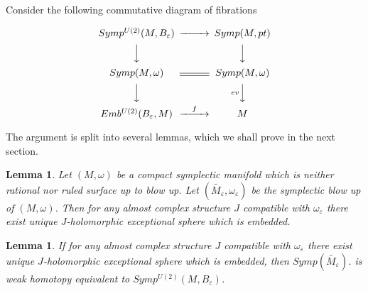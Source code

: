 \documentclass[a4paper,14pt]{article}
\newcommand{\om}{{\omega}}
\newcommand{\eps}{{\varepsilon}}
\newcommand{\Mo}{(M,\omega )}
\newcommand{\BS}{{\bigskip}}
\newcommand{\NI}{{\noindent}}
\newtheorem{lemma}[theorem]{Lemma}
\numberwithin{equation}{section}
\numberwithin{figure}{section}
\begin{document}
\NI
Consider the following commutative diagram of fibrations



$$
\CD
Symp^{U(2)}(M,B_{\eps}) @>>> Symp(M,pt) \\
  @VVV                       @VVV       \\
Symp\Mo        @=            Symp\Mo    \\
 @VVV                    @V{ev}VV       \\
Emb^{U(2)}(B_{\eps},M)  @>{f}>> M          
\endCD
$$





\BS
\NI
The argument is split into several lemmas, which we shall prove
in the next section.

\begin{lemma}\label{L:J-curves}
Let $\Mo $ be a compact symplectic manifold which is
neither  rational nor ruled surface up to blow up.
Let $(\widetilde{M_{\eps }},\om_{\eps})$ be the symplectic
blow up of $\Mo $.
Then for
any almost complex structure $J$ compatible with $\om_{\eps} $
there exist unique $J$-holomorphic exceptional sphere 
which is embedded.
\end{lemma}




\begin{lemma}\label{L:blow}
If for
any almost complex structure $J$ compatible with $\om_{\eps} $
there exist unique $J$-holomorphic exceptional sphere 
which is embedded, then 
$Symp(\widetilde{M_{\eps}})$.
is weak homotopy equivalent
to $Symp^{U(2)}(M,B_{\eps})$. 
\end{lemma}




\end{document}
